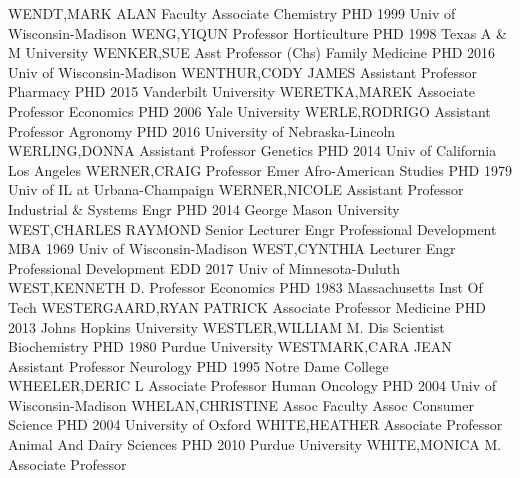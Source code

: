 \documentclass[
]{article}
\begin{document}
\textbar WENDT,MARK ALAN \textbar Faculty Associate \textbar Chemistry
\textbar PHD 1999 Univ of Wisconsin-Madison \textbar{} 
\textbar WENG,YIQUN \textbar Professor \textbar Horticulture
\textbar PHD 1998 Texas A \& M University \textbar{} 
\textbar WENKER,SUE \textbar Asst Professor (Chs) \textbar Family
Medicine \textbar PHD 2016 Univ of Wisconsin-Madison \textbar{}
 \textbar WENTHUR,CODY JAMES \textbar Assistant Professor
\textbar Pharmacy \textbar PHD 2015 Vanderbilt University \textbar{}
 \textbar WERETKA,MAREK \textbar Associate Professor
\textbar Economics \textbar PHD 2006 Yale University \textbar{}
 \textbar WERLE,RODRIGO \textbar Assistant Professor
\textbar Agronomy \textbar PHD 2016 University of Nebraska-Lincoln
\textbar{}  \textbar WERLING,DONNA \textbar Assistant
Professor \textbar Genetics \textbar PHD 2014 Univ of California Los
Angeles \textbar{}  \textbar WERNER,CRAIG \textbar Professor
Emer \textbar Afro-American Studies \textbar PHD 1979 Univ of IL at
Urbana-Champaign \textbar{}  \textbar WERNER,NICOLE
\textbar Assistant Professor \textbar Industrial \& Systems Engr
\textbar PHD 2014 George Mason University \textbar{} 
\textbar WEST,CHARLES RAYMOND \textbar Senior Lecturer \textbar Engr
Professional Development \textbar MBA 1969 Univ of Wisconsin-Madison
\textbar{}  \textbar WEST,CYNTHIA \textbar Lecturer
\textbar Engr Professional Development \textbar EDD 2017 Univ of
Minnesota-Duluth \textbar{}  \textbar WEST,KENNETH D.
\textbar Professor \textbar Economics \textbar PHD 1983 Massachusetts
Inst Of Tech \textbar{}  \textbar WESTERGAARD,RYAN PATRICK
\textbar Associate Professor \textbar Medicine \textbar PHD 2013 Johns
Hopkins University \textbar{}  \textbar WESTLER,WILLIAM M.
\textbar Dis Scientist \textbar Biochemistry \textbar PHD 1980 Purdue
University \textbar{}  \textbar WESTMARK,CARA JEAN
\textbar Assistant Professor \textbar Neurology \textbar PHD 1995 Notre
Dame College \textbar{}  \textbar WHEELER,DERIC L
\textbar Associate Professor \textbar Human Oncology \textbar PHD 2004
Univ of Wisconsin-Madison \textbar{} 
\textbar WHELAN,CHRISTINE \textbar Assoc Faculty Assoc \textbar Consumer
Science \textbar PHD 2004 University of Oxford \textbar{} 
\textbar WHITE,HEATHER \textbar Associate Professor \textbar Animal And
Dairy Sciences \textbar PHD 2010 Purdue University \textbar{}
 \textbar WHITE,MONICA M. \textbar Associate Professor
\end{document}
